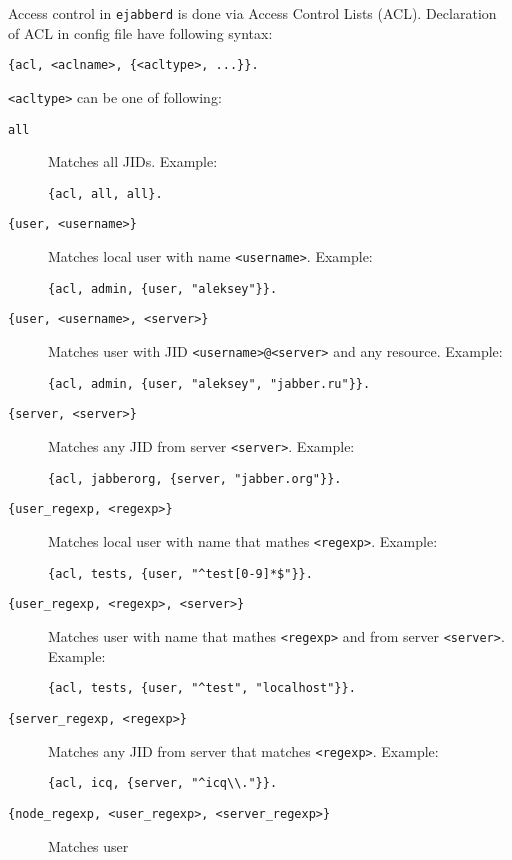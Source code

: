\documentclass[10pt]{article}
\newcommand{\ejabberd}{\texttt{ejabberd}}
\begin{document}
Access control in \ejabberd{} is done via Access Control Lists (ACL).
Declaration of ACL in config file have following syntax:
\begin{verbatim}
{acl, <aclname>, {<acltype>, ...}}.
\end{verbatim}

\texttt{<acltype>} can be one of following:
\begin{description}
\item[\texttt{all}] Matches all JIDs.  Example:
\begin{verbatim}
{acl, all, all}.
\end{verbatim}
\item[\texttt{\{user, <username>\}}] Matches local user with name
  \texttt{<username>}.  Example:
\begin{verbatim}
{acl, admin, {user, "aleksey"}}.
\end{verbatim}
\item[\texttt{\{user, <username>, <server>\}}] Matches user with JID
  \texttt{<username>@<server>} and any resource.  Example:
\begin{verbatim}
{acl, admin, {user, "aleksey", "jabber.ru"}}.
\end{verbatim}
\item[\texttt{\{server, <server>\}}] Matches any JID from server
  \texttt{<server>}.  Example:
\begin{verbatim}
{acl, jabberorg, {server, "jabber.org"}}.
\end{verbatim}
\item[\texttt{\{user\_regexp, <regexp>\}}] Matches local user with name that
  mathes \texttt{<regexp>}.  Example:
\begin{verbatim}
{acl, tests, {user, "^test[0-9]*$"}}.
\end{verbatim}
\item[\texttt{\{user\_regexp, <regexp>, <server>\}}] Matches user with name
  that mathes \texttt{<regexp>} and from server \texttt{<server>}.  Example:
\begin{verbatim}
{acl, tests, {user, "^test", "localhost"}}.
\end{verbatim}
\item[\texttt{\{server\_regexp, <regexp>\}}] Matches any JID from server that
  matches \texttt{<regexp>}.  Example:
\begin{verbatim}
{acl, icq, {server, "^icq\\."}}.
\end{verbatim}
\item[\texttt{\{node\_regexp, <user\_regexp>, <server\_regexp>\}}] Matches user

\end{description}
\end{document}
